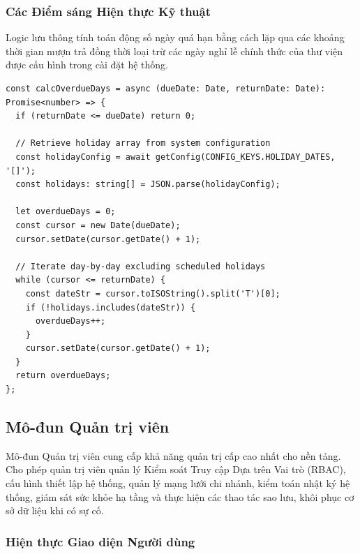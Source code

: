 \subsubsection{Các Điểm sáng Hiện thực Kỹ thuật}

Logic lưu thông tính toán động số ngày quá hạn bằng cách lặp qua các khoảng thời gian mượn trả đồng thời loại trừ các ngày nghỉ lễ chính thức của thư viện được cấu hình trong cài đặt hệ thống.

\begin{lstlisting}[caption={Tính số Ngày Quá hạn có Nhận biết Ngày Lễ (backend-express/src/modules/circulation/circulation.service.ts)}, label={lst:calc_overdue}]
const calcOverdueDays = async (dueDate: Date, returnDate: Date): Promise<number> => {
  if (returnDate <= dueDate) return 0;

  // Retrieve holiday array from system configuration
  const holidayConfig = await getConfig(CONFIG_KEYS.HOLIDAY_DATES, '[]');
  const holidays: string[] = JSON.parse(holidayConfig);

  let overdueDays = 0;
  const cursor = new Date(dueDate);
  cursor.setDate(cursor.getDate() + 1);

  // Iterate day-by-day excluding scheduled holidays
  while (cursor <= returnDate) {
    const dateStr = cursor.toISOString().split('T')[0];
    if (!holidays.includes(dateStr)) {
      overdueDays++;
    }
    cursor.setDate(cursor.getDate() + 1);
  }
  return overdueDays;
};
\end{lstlisting}

\subsection{Mô-đun Quản trị viên}

Mô-đun Quản trị viên cung cấp khả năng quản trị cấp cao nhất cho nền tảng. Cho phép quản trị viên quản lý Kiểm soát Truy cập Dựa trên Vai trò (RBAC), cấu hình thiết lập hệ thống, quản lý mạng lưới chi nhánh, kiểm toán nhật ký hệ thống, giám sát sức khỏe hạ tầng và thực hiện các thao tác sao lưu, khôi phục cơ sở dữ liệu khi có sự cố.

\subsubsection{Hiện thực Giao diện Người dùng}

